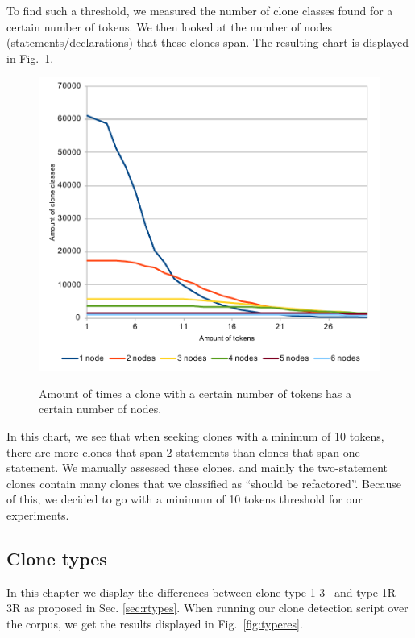 \documentclass[a4paper]{article}
\begin{document}
To find such a threshold, we measured the number of clone classes found for a certain number of tokens. We then looked at the number of nodes (statements/declarations) that these clones span. The resulting chart is displayed in Fig.~\ref{fig:tokenthreshold}.

\begin{figure}[H]
  \caption{Amount of times a clone with a certain number of tokens has a certain number of nodes.}
    \includegraphics[width=1\columnwidth]{img/TokenThreshold}
  \label{fig:tokenthreshold}
\end{figure}

In this chart, we see that when seeking clones with a minimum of 10 tokens, there are more clones that span 2 statements than clones that span one statement. We manually assessed these clones, and mainly the two-statement clones contain many clones that we classified as ``should be refactored''. Because of this, we decided to go with a minimum of 10 tokens threshold for our experiments.

\subsection{Clone types}\label{sec:clonetypeexperiments}
In this chapter we display the differences between clone type 1-3~\cite{roy2007survey} and type 1R-3R as proposed in Sec. \ref{sec:rtypes}. When running our clone detection script over the corpus, we get the results displayed in Fig.~\ref{fig:typeres}.
\end{document}
